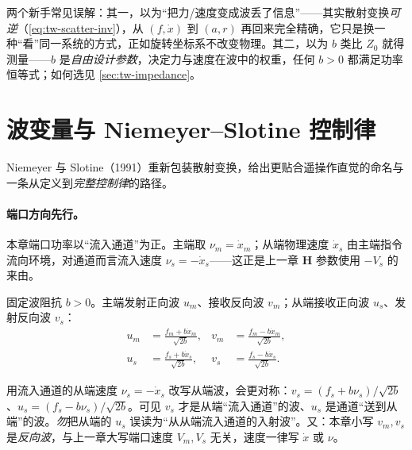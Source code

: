\begin{pitfall}
两个新手常见误解：其一，以为“把力/速度变成波丢了信息”——其实散射变换\emph{可逆}（\cref{eq:tw-scatter-inv}），从 $(f,\dot x)$ 到 $(a,r)$ 再回来完全精确，它只是换一种“看”同一系统的方式，正如旋转坐标系不改变物理。其二，以为 $b$ 类比 $Z_0$ 就得测量——$b$ 是\emph{自由设计参数}，决定力与速度在波中的权重，任何 $b>0$ 都满足功率恒等式；如何选见 \cref{sec:tw-impedance}。
\end{pitfall}

\section{波变量与 Niemeyer--Slotine 控制律}
\label{sec:tw-wavevars}

Niemeyer 与 Slotine（1991）重新包装散射变换，给出更贴合遥操作直觉的命名与一条从定义到\emph{完整控制律}的路径\cite{niemeyer1991stable}。

\paragraph{端口方向先行。}
本章端口功率以“流入通道”为正。主端取 $\nu_m=\dot x_m$；从端物理速度 $\dot x_s$ 由主端指令流向环境，对通道而言流入速度 $\nu_s=-\dot x_s$——这正是上一章 $\mathbf H$ 参数使用 $-V_s$ 的来由。

\begin{definition}[波变量]\label{def:tw-wavevars}
固定波阻抗 $b>0$。主端发射正向波 $u_m$、接收反向波 $v_m$；从端接收正向波 $u_s$、发射反向波 $v_s$：
\begin{align}
  u_m&=\frac{f_m+b\dot x_m}{\sqrt{2b}}, & v_m&=\frac{f_m-b\dot x_m}{\sqrt{2b}},\label{eq:tw-master-waves}\\
  u_s&=\frac{f_s+b\dot x_s}{\sqrt{2b}}, & v_s&=\frac{f_s-b\dot x_s}{\sqrt{2b}}.\label{eq:tw-slave-waves}
\end{align}
\end{definition}

\begin{note}
用流入通道的从端速度 $\nu_s=-\dot x_s$ 改写从端波，会更对称：$v_s=(f_s+b\nu_s)/\sqrt{2b}$、$u_s=(f_s-b\nu_s)/\sqrt{2b}$。可见 $v_s$ 才是从端“流入通道”的波、$u_s$ 是通道“送到从端”的波。\emph{勿}把从端的 $u_s$ 误读为“从从端流入通道的入射波”。又：本章小写 $v_m,v_s$ 是\emph{反向波}，与上一章大写端口速度 $V_m,V_s$ 无关，速度一律写 $\dot x$ 或 $\nu$。
\end{note}

